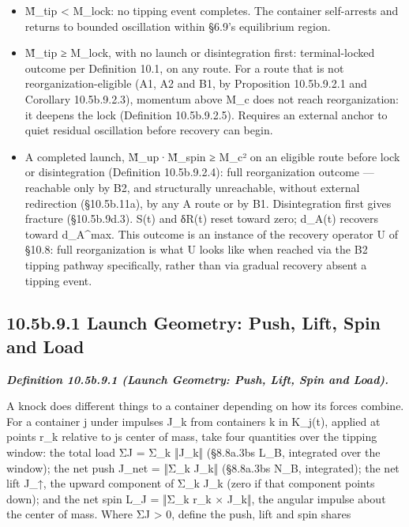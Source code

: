 \documentclass[
]{article}
\begin{document}
\begin{itemize}
\item
  M̃\_tip \textless{} M\_lock: no tipping event completes. The container
  self-arrests and returns to bounded oscillation within §6.9's
  equilibrium region.
\item
  M̃\_tip ≥ M\_lock, with no launch or disintegration first:
  terminal-locked outcome per Definition 10.1, on any route. For a route
  that is not reorganization-eligible (A1, A2 and B1, by Proposition
  10.5b.9.2.1 and Corollary 10.5b.9.2.3), momentum above M\_c does not
  reach reorganization: it deepens the lock (Definition 10.5b.9.2.5).
  Requires an external anchor to quiet residual oscillation before
  recovery can begin.
\item
  A completed launch, M̃\_up·M̃\_spin ≥ M\_c² on an eligible route before
  lock or disintegration (Definition 10.5b.9.2.4): full reorganization
  outcome --- reachable only by B2, and structurally unreachable,
  without external redirection (§10.5b.11a), by any A route or by B1.
  Disintegration first gives fracture (§10.5b.9d.3). S(t) and δR(t)
  reset toward zero; d\_A(t) recovers toward d\_A\^{}max. This outcome
  is an instance of the recovery operator U of §10.8: full
  reorganization is what U looks like when reached via the B2 tipping
  pathway specifically, rather than via gradual recovery absent a
  tipping event.
\end{itemize}

\hypertarget{b.9.1-launch-geometry-push-lift-spin-and-load}{%
\subsection{10.5b.9.1 Launch Geometry: Push, Lift, Spin and
Load}\label{b.9.1-launch-geometry-push-lift-spin-and-load}}

\emph{\textbf{Definition 10.5b.9.1 (Launch Geometry: Push, Lift, Spin
and Load).}}

A knock does different things to a container depending on how its forces
combine. For a container j under impulses J\_k from containers k in
K\_j(t), applied at points r\_k relative to j\textquotesingle s center
of mass, take four quantities over the tipping window: the total load ΣJ
= Σ\_k ‖J\_k‖ (§8.8a.3b\textquotesingle s L\_B, integrated over the
window); the net push J\_net = ‖Σ\_k J\_k‖ (§8.8a.3b\textquotesingle s
N\_B, integrated); the net lift J\_↑, the upward component of Σ\_k J\_k
(zero if that component points down); and the net spin L\_J = ‖Σ\_k r\_k
× J\_k‖, the angular impulse about the center of mass. Where ΣJ
\textgreater{} 0, define the push, lift and spin shares
\end{document}
